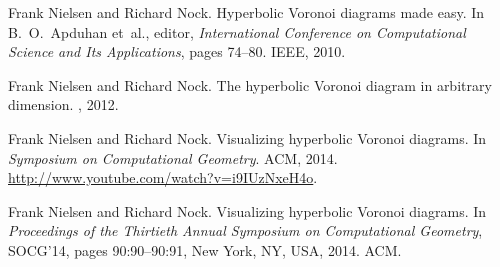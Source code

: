 \documentclass[12pt]{article}
\begin{document}
 
\nocite{*}

 

 

 
\begin{thebibliography}{1}

Frank Nielsen and Richard Nock.
\newblock Hyperbolic {V}oronoi diagrams made easy.
\newblock In B.~O.~Apduhan et~al., editor, {\em International Conference on
  Computational Science and Its Applications}, pages 74--80. IEEE, 2010.

Frank Nielsen and Richard Nock.
\newblock The hyperbolic {V}oronoi diagram in arbitrary dimension.
, 2012.

Frank Nielsen and Richard Nock.
\newblock Visualizing hyperbolic {V}oronoi diagrams.
\newblock In {\em Symposium on Computational Geometry}. ACM, 2014.
\newblock \url{http://www.youtube.com/watch?v=i9IUzNxeH4o}.

Frank Nielsen and Richard Nock.
\newblock Visualizing hyperbolic {V}oronoi diagrams.
\newblock In {\em Proceedings of the Thirtieth Annual Symposium on
  Computational Geometry}, SOCG'14, pages 90:90--90:91, New York, NY, USA,
  2014. ACM.

\end{thebibliography}
\end{document}
